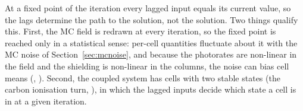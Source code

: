 At a fixed point of the iteration every lagged input equals its current
value, so the lags determine the path to the solution, not the solution. Two
things qualify this. First, the MC field is redrawn at every iteration, so
the fixed point is reached only in a statistical sense: per-cell quantities
fluctuate about it with the MC noise of Section~\ref{sec:mcnoise}, and
because the photorates are non-linear in the field and the shielding is
non-linear in the columns, the noise can bias cell means (,
). Second, the coupled system has cells with two stable states
(the carbon ionisation turn, ), in which the lagged inputs decide
which state a cell is in at a given iteration.
